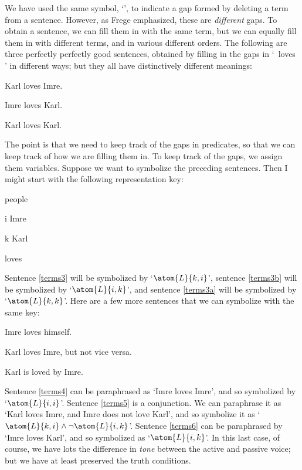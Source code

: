 We have used the same symbol, `\blank', to indicate a gap formed by deleting a term from a sentence. However, as Frege emphasized, these are \emph{different} gaps. To obtain a sentence, we can fill them in with the same term, but we can equally fill them in with different terms, and in various different orders. The following are three perfectly perfectly good sentences, obtained by filling in the gaps in `\blank\ loves \blank{}' in different ways; but they all have distinctively different meanings:
\begin{earg}
	\item[\ex{terms3}] Karl loves Imre.
	\item[\ex{terms3b}] Imre loves Karl.
	\item[\ex{terms3a}] Karl loves Karl.
\end{earg}
The point is that we need to keep track of the gaps in predicates, so that we can keep track of how we are filling them in. To keep track of the gaps, we assign them variables. Suppose we want to symbolize the preceding sentences. Then I might start with the following representation key: 
	\begin{ekey}
		\item[\text{domain}] people
		\item[i] Imre
		\item[k] Karl
		\item[\atom{L}{x,y}]  loves 
	\end{ekey}
 Sentence \ref{terms3} will be symbolized by `$\atom{L}{k,i}$', sentence \ref{terms3b} will be symbolized by `$\atom{L}{i,k}$', and sentence \ref{terms3a} will be symbolized by `$\atom{L}{k,k}$'. Here are a few more sentences that we can symbolize with the same key:
\begin{earg}
	\item[\ex{terms4}] Imre loves himself.
	\item[\ex{terms5}] Karl loves Imre, but not vice versa.
	\item[\ex{terms6}] Karl is loved by Imre.
\end{earg}
Sentence \ref{terms4} can be paraphrased as `Imre loves Imre', and so symbolized by `$\atom{L}{i,i}$'. Sentence \ref{terms5} is a conjunction. We can paraphrase it as `Karl loves Imre, and Imre does not love Karl', and so symbolize it as `$\atom{L}{k,i} \eand \enot \atom{L}{i,k}$'. Sentence \ref{terms6} can be paraphrased by `Imre loves Karl', and so symbolized as `$\atom{L}{i,k}$'. In this last case, of course, we have lots the difference in \emph{tone} between the active and passive voice; but we have at least preserved the truth conditions.

